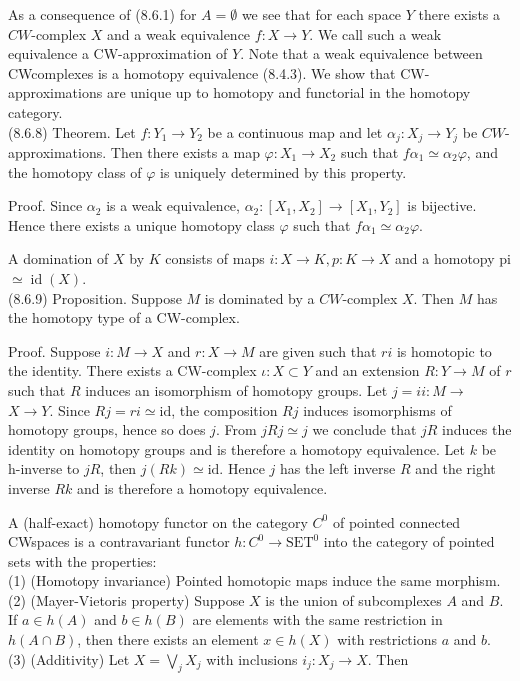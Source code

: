 \documentclass[10pt, letterpaper]{article}
\begin{document}
As a consequence of (8.6.1) for $A=\emptyset$ we see that for each space $Y$ there exists a $C W$-complex $X$ and a weak equivalence $f: X \rightarrow Y$. We call such a weak\\
equivalence a CW-approximation of $Y$. Note that a weak equivalence between CWcomplexes is a homotopy equivalence (8.4.3). We show that CW-approximations are unique up to homotopy and functorial in the homotopy category.\\
(8.6.8) Theorem. Let $f: Y_{1} \rightarrow Y_{2}$ be a continuous map and let $\alpha_{j}: X_{j} \rightarrow Y_{j}$ be $C W$-approximations. Then there exists a map $\varphi: X_{1} \rightarrow X_{2}$ such that $f \alpha_{1} \simeq \alpha_{2} \varphi$, and the homotopy class of $\varphi$ is uniquely determined by this property.

Proof. Since $\alpha_{2}$ is a weak equivalence, $\alpha_{2}:\left[X_{1}, X_{2}\right] \rightarrow\left[X_{1}, Y_{2}\right]$ is bijective. Hence there exists a unique homotopy class $\varphi$ such that $f \alpha_{1} \simeq \alpha_{2} \varphi$.

A domination of $X$ by $K$ consists of maps $i: X \rightarrow K, p: K \rightarrow X$ and a homotopy pi $\simeq \operatorname{id}(X)$.\\
(8.6.9) Proposition. Suppose $M$ is dominated by a $C W$-complex $X$. Then $M$ has the homotopy type of a CW-complex.

Proof. Suppose $i: M \rightarrow X$ and $r: X \rightarrow M$ are given such that $r i$ is homotopic to the identity. There exists a CW-complex $\iota: X \subset Y$ and an extension $R: Y \rightarrow M$ of $r$ such that $R$ induces an isomorphism of homotopy groups. Let $j=i i: M \rightarrow$ $X \rightarrow Y$. Since $R j=r i \simeq \mathrm{id}$, the composition $R j$ induces isomorphisms of homotopy groups, hence so does $j$. From $j R j \simeq j$ we conclude that $j R$ induces the identity on homotopy groups and is therefore a homotopy equivalence. Let $k$ be h-inverse to $j R$, then $j(R k) \simeq \mathrm{id}$. Hence $j$ has the left inverse $R$ and the right inverse $R k$ and is therefore a homotopy equivalence.

A (half-exact) homotopy functor on the category $C^{0}$ of pointed connected CWspaces is a contravariant functor $h: C^{0} \rightarrow \mathrm{SET}^{0}$ into the category of pointed sets with the properties:\\
(1) (Homotopy invariance) Pointed homotopic maps induce the same morphism.\\
(2) (Mayer-Vietoris property) Suppose $X$ is the union of subcomplexes $A$ and $B$. If $a \in h(A)$ and $b \in h(B)$ are elements with the same restriction in $h(A \cap B)$, then there exists an element $x \in h(X)$ with restrictions $a$ and $b$.\\
(3) (Additivity) Let $X=\bigvee_{j} X_{j}$ with inclusions $i_{j}: X_{j} \rightarrow X$. Then
\end{document}
